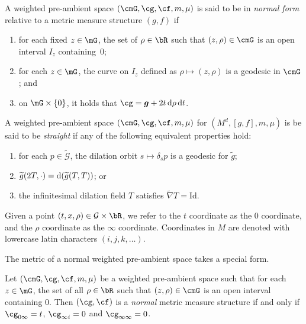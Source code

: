 \begin{Definition}
A weighted pre-ambient space $(\cmG,\cg,\cf,m,\mu)$ is said to be in \emph{normal form} relative to a metric measure structure $(g,f)$ if
\begin{enumerate}[label=$(\roman*)$]\itemsep=0pt
 \item for each fixed $z\in\mG$, the set of $\rho\in\bR$ such that $(z,\rho)\in \cmG$ is an open interval $I_z$ containing~$0$;
 \item for each $z\in\mG$, the curve on $I_z$ defined as $\rho\mapsto(z,\rho)$ is a geodesic in $\cmG$; and
 \item on $\mG\times \{0\}$, it holds that $\cg=\boldsymbol{g} + 2t\,{\rm d}\rho\,\mathrm{d}t$.
\end{enumerate}
\end{Definition}

\begin{Definition}
A weighted pre-ambient space $(\cmG,\cg,\cf,m,\mu)$ for $(M^d,[g,f],m,\mu)$ is be said to be \textit{straight} if any of the following equivalent properties hold:
\begin{enumerate}[label=$(\roman*)$]\itemsep=0pt
 \item for each $p\in \widetilde{\mathcal{G}}$, the dilation orbit $s\mapsto \delta_s p$ is a geodesic for $\widetilde{g}$;

 \item $\widetilde{g}(2T,\cdot)={\rm d}(\widetilde{g}(T,T))$; or

\item the infinitesimal dilation field $T$ satisfies $\widetilde{\nabla}T=\mathrm{Id}$.
\end{enumerate}
\end{Definition}

Given a point $(t,x,\rho)\in \mathcal{G}\times \bR$, we refer to the $t$ coordinate as the $0$ coordinate, and the $\rho$ coordinate as the $\infty$ coordinate. Coordinates in $M$ are denoted with lowercase latin characters $(i,j,k,\dots)$.

The metric of a normal weighted pre-ambient space takes a special form.

\begin{Lemma}
\label{straight-metric-lemma}
Let $(\cmG,\cg,\cf,m,\mu)$ be a weighted pre-ambient space such that for each $z\in\mG$, the set of all $\rho\in\bR$ such that $(z,\rho)\in\cmG$ is an open interval containing $0$. Then $(\cg,\cf)$ is a \textit{normal} metric measure structure if and only if $\cg_{0\infty}=t$, $\cg_{\infty i}=0$ and $\cg_{\infty\infty}=0$.
\end{Lemma}

